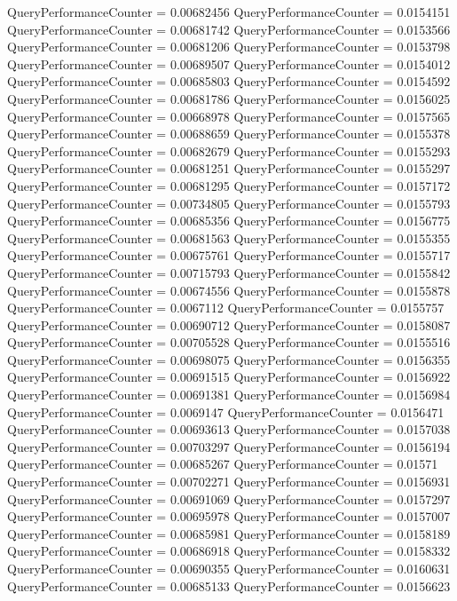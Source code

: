 \documentclass[9pt]{article}
\theoremstyle{plain}
\theoremstyle{definition}
\theoremstyle{remark}
\numberwithin{equation}{section}
\begin{document}
QueryPerformanceCounter  =  0.00682456
QueryPerformanceCounter  =  0.0154151
QueryPerformanceCounter  =  0.00681742
QueryPerformanceCounter  =  0.0153566
QueryPerformanceCounter  =  0.00681206
QueryPerformanceCounter  =  0.0153798
QueryPerformanceCounter  =  0.00689507
QueryPerformanceCounter  =  0.0154012
QueryPerformanceCounter  =  0.00685803
QueryPerformanceCounter  =  0.0154592
QueryPerformanceCounter  =  0.00681786
QueryPerformanceCounter  =  0.0156025
QueryPerformanceCounter  =  0.00668978
QueryPerformanceCounter  =  0.0157565
QueryPerformanceCounter  =  0.00688659
QueryPerformanceCounter  =  0.0155378
QueryPerformanceCounter  =  0.00682679
QueryPerformanceCounter  =  0.0155293
QueryPerformanceCounter  =  0.00681251
QueryPerformanceCounter  =  0.0155297
QueryPerformanceCounter  =  0.00681295
QueryPerformanceCounter  =  0.0157172
QueryPerformanceCounter  =  0.00734805
QueryPerformanceCounter  =  0.0155793
QueryPerformanceCounter  =  0.00685356
QueryPerformanceCounter  =  0.0156775
QueryPerformanceCounter  =  0.00681563
QueryPerformanceCounter  =  0.0155355
QueryPerformanceCounter  =  0.00675761
QueryPerformanceCounter  =  0.0155717
QueryPerformanceCounter  =  0.00715793
QueryPerformanceCounter  =  0.0155842
QueryPerformanceCounter  =  0.00674556
QueryPerformanceCounter  =  0.0155878
QueryPerformanceCounter  =  0.0067112
QueryPerformanceCounter  =  0.0155757
QueryPerformanceCounter  =  0.00690712
QueryPerformanceCounter  =  0.0158087
QueryPerformanceCounter  =  0.00705528
QueryPerformanceCounter  =  0.0155516
QueryPerformanceCounter  =  0.00698075
QueryPerformanceCounter  =  0.0156355
QueryPerformanceCounter  =  0.00691515
QueryPerformanceCounter  =  0.0156922
QueryPerformanceCounter  =  0.00691381
QueryPerformanceCounter  =  0.0156984
QueryPerformanceCounter  =  0.0069147
QueryPerformanceCounter  =  0.0156471
QueryPerformanceCounter  =  0.00693613
QueryPerformanceCounter  =  0.0157038
QueryPerformanceCounter  =  0.00703297
QueryPerformanceCounter  =  0.0156194
QueryPerformanceCounter  =  0.00685267
QueryPerformanceCounter  =  0.01571
QueryPerformanceCounter  =  0.00702271
QueryPerformanceCounter  =  0.0156931
QueryPerformanceCounter  =  0.00691069
QueryPerformanceCounter  =  0.0157297
QueryPerformanceCounter  =  0.00695978
QueryPerformanceCounter  =  0.0157007
QueryPerformanceCounter  =  0.00685981
QueryPerformanceCounter  =  0.0158189
QueryPerformanceCounter  =  0.00686918
QueryPerformanceCounter  =  0.0158332
QueryPerformanceCounter  =  0.00690355
QueryPerformanceCounter  =  0.0160631
QueryPerformanceCounter  =  0.00685133
QueryPerformanceCounter  =  0.0156623
\end{document}
